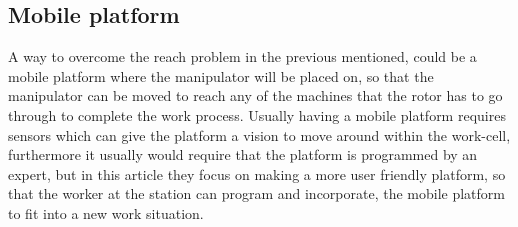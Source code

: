 \subsection{Mobile platform}
A way to overcome the reach problem in the previous mentioned, could be a mobile platform where the manipulator will be placed on, so that the manipulator can be moved to reach any of the machines that the rotor has to go through to complete the work process. Usually having a mobile platform requires sensors which can give the platform a vision to move around within the work-cell\cite{doi:10.1177/1729881417718588}, furthermore it usually would require that the platform is programmed by an expert, but in this article \cite{doi:10.1177/1729881417718588} they focus on making a more user friendly platform, so that the worker at the station can program and incorporate, the mobile platform to fit into a new work situation.\\



